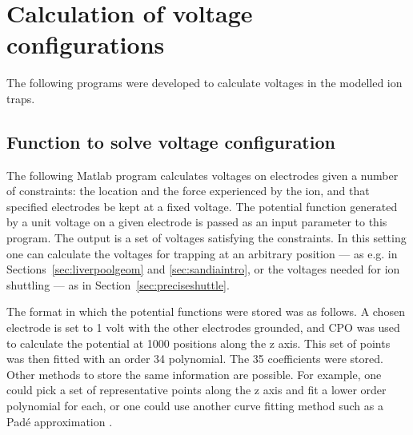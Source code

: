 \chapter{Calculation of voltage configurations}
\label{app:voltagecalc}

The following programs were developed to calculate voltages in the modelled ion traps. 

\section{Function to solve voltage configuration}
\label{sec:voltprepare}
The following Matlab program calculates voltages on electrodes given a number of constraints: the location and the force experienced by the ion, and that specified electrodes be kept at a fixed voltage. The potential function generated by a unit voltage on a given electrode is passed as an input parameter to this program. The output is a set of voltages satisfying the constraints. In this setting one can calculate the voltages for trapping at an arbitrary position --- as e.g. in Sections~\ref{sec:liverpoolgeom} and \ref{sec:sandiaintro}, or the voltages needed for ion shuttling --- as in Section~\ref{sec:preciseshuttle}. 

The format in which the potential functions were stored was as follows. A chosen electrode is set to 1 volt with the other electrodes grounded, and CPO was used to calculate the potential at 1000 positions along the z axis. This set of points was then fitted with an order 34 polynomial. The 35 coefficients were stored. Other methods to store the same information are possible. For example, one could pick a set of representative points along the z axis and fit a lower order polynomial for each, or one could use another curve fitting method such as a Pad\'e approximation \cite{Baker1996}.
 

